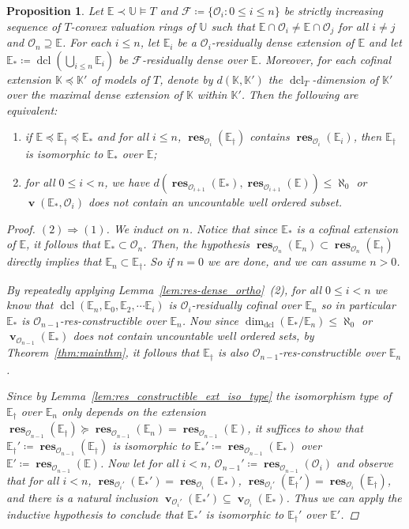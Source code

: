 \documentclass{amsart}
\newtheorem{proposition}[theorem]{Proposition}
\theoremstyle{remark}
\theoremstyle{definition}
\theoremstyle{plain}
\newcommand{\bE}{\mathbb E}
\newcommand{\bK}{\mathbb K}
\newcommand{\bU}{\mathbb U}
\newcommand{\cF}{\mathcal F}
\newcommand{\cO}{\mathcal O}
\DeclareMathOperator{\val}{\mathbf{v}}
\DeclareMathOperator{\res}{\mathbf{res}}
\DeclareMathOperator{\dcl}{\mathrm{dcl}}
\theoremstyle{plain}
\begin{document}
\begin{proposition}\label{prop:pseudo-completions_subs}
     Let $\bE \prec \bU\models T$ and $\cF\coloneqq \{\cO_i : 0 \le i\le n\}$ be strictly increasing sequence of $T$-convex valuation rings of $\bU$ such that $\bE \cap \cO_i \neq \bE \cap \cO_j$ for all $i\neq j$ and $\cO_n\supseteq \bE$.
     For each $i\le n$, let $\bE_i$ be a $\cO_i$-residually dense extension of $\bE$ and let $\bE_*\coloneqq \dcl(\bigcup_{i \le n}\bE_i)$ be $\cF$-residually dense over $\bE$. Moreover, for each cofinal extension $\bK \preceq \bK'$ of models of $T$, denote by $d(\bK, \bK')$ the $\dcl_T$-dimension of $\bK'$ over the maximal dense extension of $\bK$ within $\bK'$. Then the following are equivalent:
    \begin{enumerate}
        \item if $\bE \preceq \bE_\dagger \preceq \bE_*$ and for all $i\le n$, $\res_{\cO_i}(\bE_\dagger)$ contains $\res_{\cO_i}(\bE_i)$, then $\bE_\dagger$ is isomorphic to $\bE_*$ over $\bE$;
        \item for all $0 \le i < n$, we have $d(\res_{\cO_{i+1}}(\bE_*),\res_{\cO_{i+1}}(\bE))\le \aleph_0$ or $\val(\bE_*, \cO_i)$ does not contain an uncountable well ordered subset.
    \end{enumerate}
    \begin{proof}
        $(2) \Rightarrow (1)$. We induct on $n$.
        Notice that since $\bE_*$ is a cofinal extension of $\bE$, it follows that $\bE_* \subset \cO_n$. Then, the hypothesis $\res_{\cO_n}(\bE_n) \subset \res_{\cO_n}(\bE_\dagger)$ directly implies that $\bE_n \subset \bE_\dagger$.
        So if $n=0$ we are done, and we can assume $n> 0$.

        By repeatedly applying Lemma~\ref{lem:res-dense_ortho}~(2), for all $0\leq i<n$ we know that \break $\dcl(\bE_n,\bE_0,\bE_2, \cdots \bE_i)$ is $\cO_{i}$-residually cofinal over $\bE_n$ so in particular $\bE_*$ is $\cO_{n-1}$-res-constructible over $\bE_n$. Now since $\dim_{\dcl}(\bE_*/\bE_n)\le \aleph_0$ or $\val_{\cO_{n-1}}(\bE_*)$ does not contain uncountable well ordered sets, by Theorem~\ref{thm:mainthm}, it follows that $\bE_\dagger$ is also $\cO_{n-1}$-res-constructible over $\bE_n$.
        
        Since by Lemma~\ref{lem:res_constructible_ext_iso_type} the isomorphism type of $\bE_\dagger$ over $\bE_n$ only depends on the extension $\res_{\cO_{n-1}}(\bE_\dagger)\succeq \res_{\cO_{n-1}}(\bE_n)=\res_{\cO_{n-1}}(\bE)$, it suffices to show that $\bE_\dagger'\coloneqq \res_{\cO_{n-1}}(\bE_\dagger)$ is isomorphic to $\bE_*'\coloneqq \res_{\cO_{n-1}}(\bE_*)$ over $\bE'\coloneqq \res_{\cO_{n-1}}(\bE)$. Now let for all $i<n$, $\cO_{n-1}'\coloneqq \res_{\cO_{n-1}}(\cO_i)$ and observe that for all $i<n$, $\res_{\cO_{i}'}(\bE_*')=\res_{\cO_{i}}(\bE_*)$, $\res_{\cO_{i}'}(\bE_\dagger')=\res_{\cO_{i}}(\bE_\dagger)$, and there is a natural inclusion $\val_{\cO_{i}'}(\bE_*') \subseteq \val_{\cO_{i}}(\bE_*)$.
        Thus we can apply the inductive hypothesis to conclude that $\bE_*'$ is isomorphic to $\bE_\dagger'$ over $\bE'$.


\end{proof}
\end{proposition}
\end{document}
